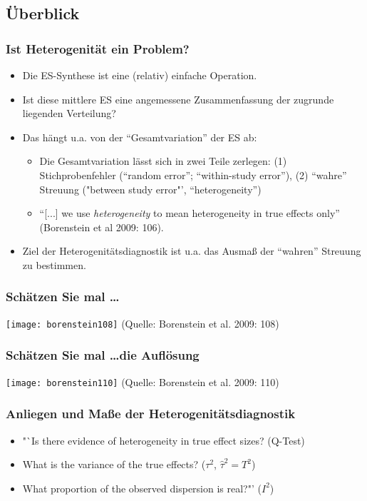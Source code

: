 \subsection{Überblick}\label{sec:heteroueberblick}

\begin{frame}
  \frametitle{Ist Heterogenität ein Problem?}\label{fr:heterodef}
  \begin{itemize}[<+->]
  \item<+-> Die ES-Synthese ist eine (relativ) einfache Operation.
  \item<+-> Ist diese mittlere ES eine angemessene Zusammenfassung der
    zugrunde liegenden Verteilung?
  \item<+-> Das hängt u.a. von der "`Gesamtvariation"' der ES ab:
    \begin{itemize}
    \item Die Gesamtvariation lässt sich in zwei Teile zerlegen: (1) Stichprobenfehler ("`random error"';
      "`within-study error"'), (2) "`wahre"' Streuung ("between study error"', "`heterogeneity"')
    \item "`[...] we use \emph{heterogeneity} to mean heterogeneity in true effects only"' (Borenstein et al 2009: 106).
    \end{itemize}
\item<+-> Ziel der Heterogenitätsdiagnostik ist u.a. das Ausmaß der "`wahren"' Streuung zu bestimmen.
  \end{itemize}
\end{frame}

\begin{frame}[plain]
  \frametitle{Schätzen Sie mal \ldots}
  \texttt{[image: borenstein108]}
\newline(Quelle: Borenstein et al. 2009: 108)
\end{frame}


\begin{frame}[shrink = 5]
  \frametitle{Schätzen Sie mal \ldots die Auflösung}
  \texttt{[image: borenstein110]}
\newline(Quelle: Borenstein et al. 2009: 110)
\end{frame}


\begin{frame}
  \frametitle{Anliegen und Maße der Heterogenitätsdiagnostik}
  \begin{itemize}[<+->]
  \item<+-> "`Is there evidence of heterogeneity in true effect sizes? (Q-Test)
  \item<+-> What is the variance of the true effects? ($\tau^2$, $\widehat{\tau}^2 = T^2$)
  \item<+-> What proportion of the observed dispersion is real?"' ($I^2$)
  \end{itemize}

\citep[Quelle: ][105]{borenstein_introduction_2009}
\end{frame}



